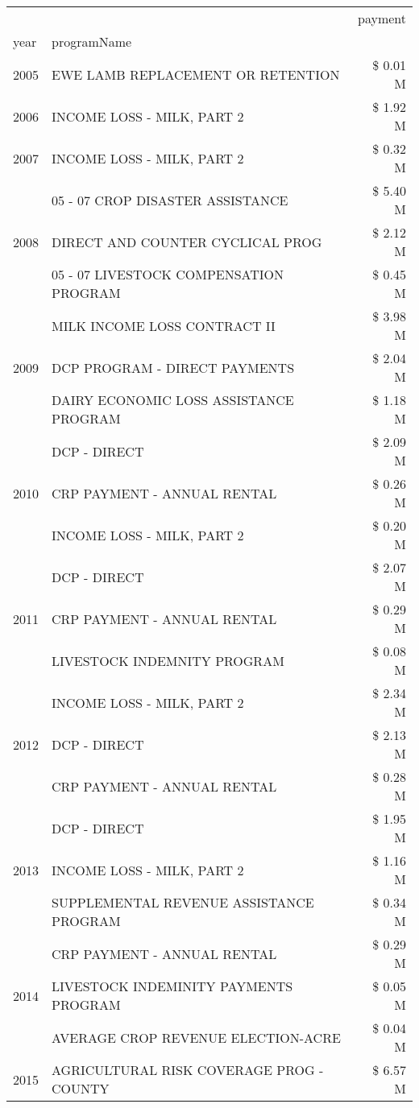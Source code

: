 \begin{tabular}{llr}
\toprule
 &  & payment \\
year & programName &  \\
\midrule
2005 & EWE LAMB REPLACEMENT OR RETENTION & \$ 0.01 M \\
\cline{1-3}
2006 & INCOME LOSS - MILK, PART 2 & \$ 1.92 M \\
\cline{1-3}
2007 & INCOME LOSS - MILK, PART 2 & \$ 0.32 M \\
\cline{1-3}
\multirow[t]{3}{*}{2008} & 05 - 07 CROP DISASTER ASSISTANCE & \$ 5.40 M \\
 & DIRECT AND COUNTER CYCLICAL PROG & \$ 2.12 M \\
 & 05 - 07 LIVESTOCK COMPENSATION PROGRAM & \$ 0.45 M \\
\cline{1-3}
\multirow[t]{3}{*}{2009} & MILK INCOME LOSS CONTRACT II & \$ 3.98 M \\
 & DCP PROGRAM - DIRECT PAYMENTS & \$ 2.04 M \\
 & DAIRY ECONOMIC LOSS ASSISTANCE PROGRAM & \$ 1.18 M \\
\cline{1-3}
\multirow[t]{3}{*}{2010} & DCP - DIRECT & \$ 2.09 M \\
 & CRP PAYMENT - ANNUAL RENTAL & \$ 0.26 M \\
 & INCOME LOSS - MILK, PART 2 & \$ 0.20 M \\
\cline{1-3}
\multirow[t]{3}{*}{2011} & DCP - DIRECT & \$ 2.07 M \\
 & CRP PAYMENT - ANNUAL RENTAL & \$ 0.29 M \\
 & LIVESTOCK INDEMNITY PROGRAM & \$ 0.08 M \\
\cline{1-3}
\multirow[t]{3}{*}{2012} & INCOME LOSS - MILK, PART 2 & \$ 2.34 M \\
 & DCP - DIRECT & \$ 2.13 M \\
 & CRP PAYMENT - ANNUAL RENTAL & \$ 0.28 M \\
\cline{1-3}
\multirow[t]{3}{*}{2013} & DCP - DIRECT & \$ 1.95 M \\
 & INCOME LOSS - MILK, PART 2 & \$ 1.16 M \\
 & SUPPLEMENTAL REVENUE ASSISTANCE PROGRAM & \$ 0.34 M \\
\cline{1-3}
\multirow[t]{3}{*}{2014} & CRP PAYMENT - ANNUAL RENTAL & \$ 0.29 M \\
 & LIVESTOCK INDEMINITY PAYMENTS PROGRAM & \$ 0.05 M \\
 & AVERAGE CROP REVENUE ELECTION-ACRE & \$ 0.04 M \\
\cline{1-3}
\multirow[t]{3}{*}{2015} & AGRICULTURAL RISK COVERAGE PROG - COUNTY & \$ 6.57 M \\

\end{tabular}
